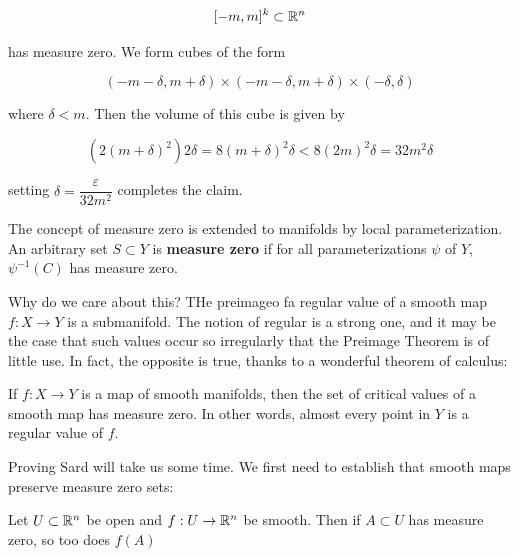 \[[-m,m]^k \subset \mathbb{R}^n\]

has measure zero. We form cubes of the form

\[(-m-\delta, m + \delta) \times (-m-\delta, m + \delta) \times (-\delta, \delta)\]

where $\delta < m$. Then the volume of this cube is given by 

\[(2(m+\delta)^2)2\delta = 8(m+\delta)^2\delta < 8(2m)^2\delta = 32m^2\delta\]


setting $\delta = \dfrac{\varepsilon}{32m^2}$ completes the claim.

The concept of measure zero is extended to manifolds by local parameterization. An arbitrary set $S \subset Y$ is \textbf{measure zero} if for all parameterizations $\psi$ of $Y$, $\psi^{-1}(C)$ has measure zero. 

Why do we care about this? THe preimageo fa regular value of a smooth map $f: X \to Y$ is a submanifold. The notion of regular is a strong one, and it may be the case that such values occur so irregularly that the Preimage Theorem is of little use. In fact, the opposite is true, thanks to a wonderful theorem of calculus:

\begin{theorem}
    If $f: X \to Y$ is a map of smooth manifolds, then the set of critical values of a smooth map has measure zero. In other words, almost every point in $Y$ is a regular value of $f$. 
\end{theorem}

Proving Sard will take us some time. We first need to establish that smooth maps preserve measure zero sets:

\begin{prop}
    Let $U \subset \mathbb{R}^n$ be open and $f: U \to \mathbb{R}^n$ be smooth. Then if $A \subset U$ has measure zero, so too does $f(A)$
\end{prop}

